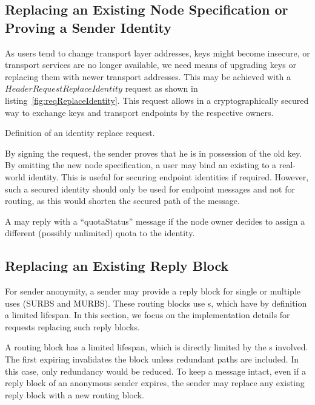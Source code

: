 \subsection{Replacing an Existing Node Specification or Proving a Sender Identity\label{sec:replaceID}}
As users tend to change transport layer addresses, keys might become insecure, or transport services are no longer available, we need means of upgrading keys or replacing them with newer transport addresses. This may be achieved with a $HeaderRequestReplaceIdentity$ request as shown in listing~\ref{fig:reqReplaceIdentity}. This request allows in a cryptographically secured way to exchange keys and transport endpoints by the respective owners.

\begin{lstfloat}[ht]
	
	\caption{Definition of an identity replace request.}
	\label{fig:reqReplaceIdentity}
\end{lstfloat}

By signing the request, the sender proves that he is in possession of the old key. By omitting the new node specification, a user may bind an existing  to a real-world identity. This is useful for securing endpoint identities if required. However, such a secured identity should only be used for endpoint messages and not for routing, as this would shorten the secured path of the message.

A \VortexNode{} may reply with a ``quotaStatus'' message if the node owner decides to assign a different (possibly unlimited) quota to the identity. 

\subsection{Replacing an Existing Reply Block\label{sec:replaceMURB}}
For sender anonymity, a sender may provide a reply block for single or multiple uses (SURBS and MURBS). These routing blocks use s, which have by definition a limited lifespan. In this section, we focus on the implementation details for requests replacing such reply blocks.

A routing block has a limited lifespan, which is directly limited by the s involved. The first expiring  invalidates the block unless redundant paths are included. In this case, only redundancy would be reduced. To keep a message intact, even if a reply block of an anonymous sender expires, the sender may replace any existing reply block with a new routing block.

